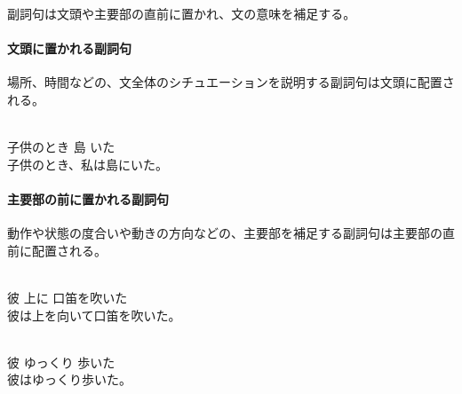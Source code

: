 副詞句は文頭や主要部の直前に置かれ、文の意味を補足する。

\paragraph{文頭に置かれる副詞句}
場所、時間などの、文全体のシチュエーションを説明する副詞句は文頭に配置される。

\begin{exe}
    \ex {} \\
        子供のとき 島 いた \\
    \glt 子供のとき、私は島にいた。
\end{exe}

\paragraph{主要部の前に置かれる副詞句}
動作や状態の度合いや動きの方向などの、主要部を補足する副詞句は主要部の直前に配置される。

\begin{exe}
    \ex {} \\
        彼 上に 口笛を吹いた \\
    \glt 彼は上を向いて口笛を吹いた。
\end{exe}
\begin{exe}
    \ex \gll [k\'ap\'a] [piti] [t\'iv\textipa{\'O}p\'a] \\
        彼 ゆっくり 歩いた \\
    \glt 彼はゆっくり歩いた。
\end{exe}